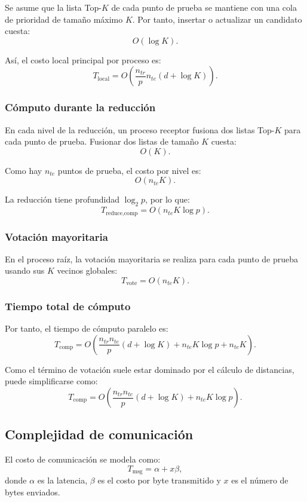 \documentclass[11pt,a4paper]{article}
\begin{document}
Se asume que la lista Top-$K$ de cada punto de prueba se mantiene con una cola de prioridad
de tamaño máximo $K$. Por tanto, insertar o actualizar un candidato cuesta:
\[
O(\log K).
\]

Así, el costo local principal por proceso es:
\[
T_{\text{local}}
=
O\left(
\frac{n_{tr}}{p} n_{te}(d+\log K)
\right).
\]

\subsubsection{Cómputo durante la reducción}

En cada nivel de la reducción, un proceso receptor fusiona dos listas Top-$K$ para cada punto
de prueba. Fusionar dos listas de tamaño $K$ cuesta:
\[
O(K).
\]

Como hay $n_{te}$ puntos de prueba, el costo por nivel es:
\[
O(n_{te}K).
\]

La reducción tiene profundidad $\log_2 p$, por lo que:
\[
T_{\text{reduce,comp}}
=
O(n_{te}K\log p).
\]

\subsubsection{Votación mayoritaria}

En el proceso raíz, la votación mayoritaria se realiza para cada punto de prueba usando sus
$K$ vecinos globales:
\[
T_{\text{vote}}
=
O(n_{te}K).
\]

\subsubsection{Tiempo total de cómputo}

Por tanto, el tiempo de cómputo paralelo es:
\[
T_{\text{comp}}
=
O\left(
\frac{n_{tr}n_{te}}{p}(d+\log K)
+
n_{te}K\log p
+
n_{te}K
\right).
\]

Como el término de votación suele estar dominado por el cálculo de distancias, puede
simplificarse como:
\[
\boxed{
T_{\text{comp}}
=
O\left(
\frac{n_{tr}n_{te}}{p}(d+\log K)
+
n_{te}K\log p
\right)
}.
\]

\subsection{Complejidad de comunicación}

El costo de comunicación se modela como:
\[
T_{\text{msg}} = \alpha + x\beta,
\]
donde $\alpha$ es la latencia, $\beta$ es el costo por byte transmitido y $x$ es el número
de bytes enviados.
\end{document}
